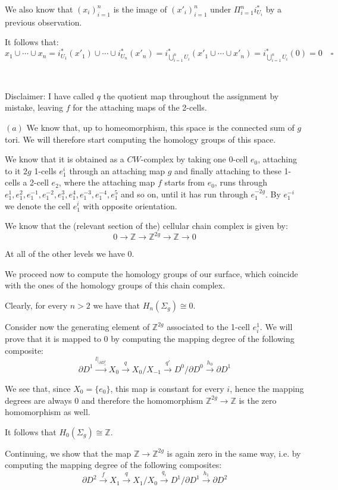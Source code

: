 \documentclass{article}
\newcommand{\numberset}{\mathbb}
\newcommand{\Z}{\numberset{Z}}
\newcommand{\exercise}[1]{\noindent {\bf Exercise #1}}
\begin{document}
We also know that $(x_i)_{i=1}^n$ is the image of $(x'_i)_{i=1}^n$ under
$\Pi_{i=1}^n i^*_{U_i}$ by a previous observation.

It follows that:
$$x_1\cup\cdots\cup x_n=i^*_{U_1}(x'_1)\cup\cdots\cup
i^*_{U_n}(x'_n)=i^*_{\bigcup_{i=1}^n U_i}(x'_1\cup\cdots\cup
x'_n)=i^*_{\bigcup_{i=1}^n U_i}(0)=0\quad\square$$


~\\
\exercise{5}

Disclaimer: I have called $q$ the quotient map throughout the assignment by
mistake, leaving $f$ for the attaching maps of the 2-cells.

\proof $(a)$ We know that, up to homeomorphism, this space is the connected sum
of $g$ tori. We will therefore start computing the homology groups of this space.

We know that it is obtained as a $CW$-complex by taking one 0-cell
$e_0$, attaching to it $2g$ 1-cells $e^i_1$ through an attaching map $g$ and
finally attaching to these
1-cells a 2-cell $e_2$, where the attaching map $f$ starts from $e_0$, runs
through $e^1_1,e^2_1,e^{-1}_1,e^{-2}_1,e^3_1,e^4_1,e^{-3}_1,e^{-4}_1,e^5_1$ and
so on, until it has run through $e^{-2g}_1$. By $e^{-i}_1$ we denote the cell
$e^i_1$ with opposite orientation.
 
We know that the (relevant section of the) cellular chain complex is given by:
$$0\rightarrow\Z\rightarrow\Z^{2g}\rightarrow\Z\rightarrow 0$$

At all of the other levels we have 0.

We proceed now to compute the homology groups of our surface, which coincide with
the ones of the homology groups of this chain complex.

Clearly, for every $n>2$ we have that $H_n(\Sigma_g)\cong 0$.

Consider now the generating element of $\Z^{2g}$ associated to the 1-cell
$e^1_i$. We will prove that it is mapped to 0 by computing the
mapping degree of the following composite:
$$\partial D^1\xrightarrow{l|_{\partial
D^1_i}} X_0\xrightarrow{q} X_0/X_{-1}\xrightarrow{q'}
D^0/\partial D^0\xrightarrow{h_0}\partial D^1$$

We see that, since $X_0=\{e_0\}$, this map is constant for every $i$, hence the
mapping degrees are always 0 and therefore the homomorphism $\Z^{2g}\rightarrow
\Z$ is the zero homomorphism as well.

It follows that $H_0(\Sigma_g)\cong\Z$.

Continuing, we show that the map $\Z\rightarrow\Z^{2g}$ is again zero in the
same way, i.e. by computing the mapping degree of the following composites:
$$\partial D^2\xrightarrow{f} X_1\xrightarrow{q} X_1/X_0\xrightarrow{q_i}
D^1/\partial D^1\xrightarrow{h_1}\partial D^2$$
\end{document}
